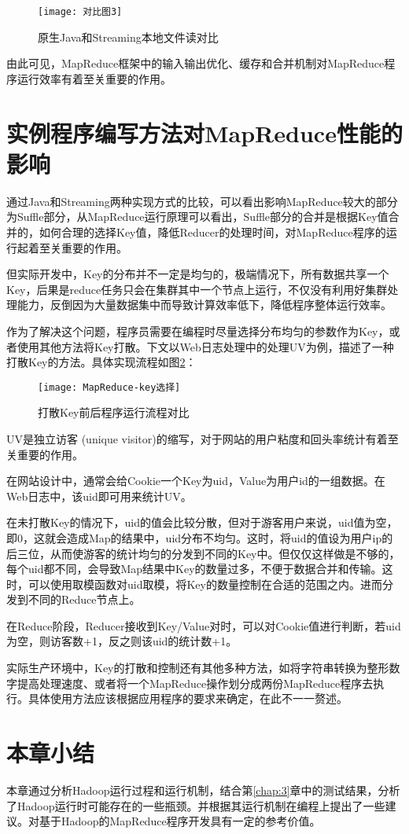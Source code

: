 \begin{figure}[!h]
 \centering
 \texttt{[image: 对比图3]}
 \caption{原生Java和Streaming本地文件读对比}
 \label{fig:对比图3}
\end{figure}


由此可见，MapReduce框架中的输入输出优化、缓存和合并机制对MapReduce程序运行效率有着至关重要的作用。


\section{实例程序编写方法对MapReduce性能的影响}
通过Java和Streaming两种实现方式的比较，可以看出影响MapReduce较大的部分为Suffle部分，从MapReduce运行原理可以看出，Suffle部分的合并是根据Key值合并的，如何合理的选择Key值，降低Reducer的处理时间，对MapReduce程序的运行起着至关重要的作用。

但实际开发中，Key的分布并不一定是均匀的，极端情况下，所有数据共享一个Key，后果是reduce任务只会在集群其中一个节点上运行，不仅没有利用好集群处理能力，反倒因为大量数据集中而导致计算效率低下，降低程序整体运行效率。

作为了解决这个问题，程序员需要在编程时尽量选择分布均匀的参数作为Key，或者使用其他方法将Key打散。下文以Web日志处理中的处理UV为例，描述了一种打散Key的方法。具体实现流程如图\ref{fig:MapReduce-key选择}：

\begin{figure}[!h]
 \centering
 \texttt{[image: MapReduce-key选择]}
 \caption{打散Key前后程序运行流程对比}
 \label{fig:MapReduce-key选择}
\end{figure}

UV是独立访客 (unique visitor)的缩写，对于网站的用户粘度和回头率统计有着至关重要的作用。

在网站设计中，通常会给Cookie一个Key为uid，Value为用户id的一组数据。在Web日志中，该uid即可用来统计UV。

在未打散Key的情况下，uid的值会比较分散，但对于游客用户来说，uid值为空，即0，这就会造成Map的结果中，uid分布不均匀。这时，将uid的值设为用户ip的后三位，从而使游客的统计均匀的分发到不同的Key中。但仅仅这样做是不够的，每个uid都不同，会导致Map结果中Key的数量过多，不便于数据合并和传输。这时，可以使用取模函数对uid取模，将Key的数量控制在合适的范围之内。进而分发到不同的Reduce节点上。

在Reduce阶段，Reducer接收到Key/Value对时，可以对Cookie值进行判断，若uid为空，则访客数+1，反之则该uid的统计数+1。

实际生产环境中，Key的打散和控制还有其他多种方法，如将字符串转换为整形数字提高处理速度、或者将一个MapReduce操作划分成两份MapReduce程序去执行。具体使用方法应该根据应用程序的要求来确定，在此不一一赘述。

\section{本章小结}
本章通过分析Hadoop运行过程和运行机制，结合第\ref{chap:3}章中的测试结果，分析了Hadoop运行时可能存在的一些瓶颈。并根据其运行机制在编程上提出了一些建议。对基于Hadoop的MapReduce程序开发具有一定的参考价值。